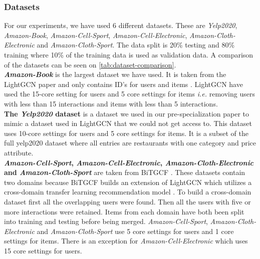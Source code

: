 \subsubsection{Datasets}
For our experiments, we have used 6 different datasets.
These are \textit{Yelp2020}, \textit{Amazon-Book}, \textit{Amazon-Cell-Sport}, \textit{Amazon-Cell-Electronic}, \textit{Amazon-Cloth-Electronic} and \textit{Amazon-Cloth-Sport}.
The data split is 20\% testing and 80\% training where 10\% of the training data is used as validation data.
A comparison of the datasets can be seen on \autoref{tab:dataset-comparison}.
\\
\textbf{\textit{Amazon-Book}} is the largest dataset we have used.
It is taken from the LightGCN paper and only contains ID's for users and items \cite{lightgcn}.
LightGCN have used the 15-core setting for users and 5 core settings for items \textit{i.e.} removing users with less than 15 interactions and items with less than 5 interactions.
\\
\textbf{The \textit{Yelp2020} dataset} is a dataset we used in our pre-specialization paper to mimic a dataset used in LightGCN that we could not get access to.
This dataset uses 10-core settings for users and 5 core settings for items.
It is a subset of the full yelp2020 dataset where all entries are restaurants with one category and price attribute.
\\
\textbf{\textit{Amazon-Cell-Sport}, \textit{Amazon-Cell-Electronic}, \textit{Amazon-Cloth-Electronic} and \textit{Amazon-Cloth-Sport}} are taken from BiTGCF \cite{BiTGCF}.
These datasets contain two domains because BiTGCF builds an extension of LightGCN which utilizes a cross-domain transfer learning recommendation model \cite{BiTGCF}.
To build a cross-domain dataset first all the overlapping users were found.
Then all the users with five or more interactions were retained.
Items from each domain have both been split into training and testing before being merged.
\textit{Amazon-Cell-Sport}, \textit{Amazon-Cloth-Electronic} and \textit{Amazon-Cloth-Sport} use 5 core settings for users and 1 core settings for items.
There is an exception for \textit{Amazon-Cell-Electronic} which uses 15 core settings for users.
